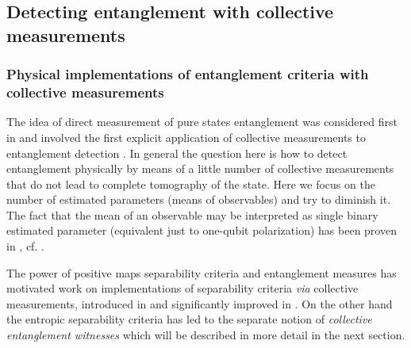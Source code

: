 \documentclass[rmp,12pt,preprint]{revtex4-2}
\begin{document}
\subsection{Detecting entanglement with collective measurements}
\label{subsec:det_ent_col}

\subsubsection{Physical implementations of entanglement criteria with
collective measurements \label{subsubsec:MapsDetected}}

The idea of direct measurement of pure states entanglement was
considered first in \cite{SH00} and involved the first
explicit application of collective measurements to entanglement
detection \cite{Acin}. In general the question here is how
to detect entanglement physically by means of a little number of
collective measurements that do not lead to complete tomography of the
state. Here we focus on the number of estimated parameters (means of
observables) and try to diminish it. The fact that the mean of an
observable may be interpreted as single binary estimated parameter
(equivalent just to one-qubit polarization) has been proven in
\cite{binpovm,PazRoncaglia}, cf. \cite{Brun}.

The power of positive maps separability criteria and entanglement
measures has motivated work on implementations of separability
criteria {\it via} collective measurements, introduced in
\cite{PHAE,PHPRL} and significantly improved in
\cite{Carteret,Noiseless}. On the other hand the entropic separability
criteria has led to the separate notion of {\it collective
  entanglement witnesses} \cite{Witnesses} which will be described in
more detail in the next section.
\end{document}
